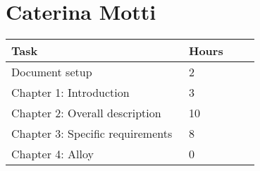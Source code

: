 \section{Caterina Motti}
\begin{center}
	\begin{tabular}{@{}p{0.5\linewidth} p{0.2\linewidth}@{}}
		\hline
		\textbf{Task} & \textbf{Hours} \\ \hline
            Document setup & 2 \\ \hline
            Chapter 1: Introduction & 3 \\ \hline
            Chapter 2: Overall description & 10 \\ \hline
            Chapter 3: Specific requirements & 8 \\ \hline
            Chapter 4: Alloy & 0 \\ \hline
	\end{tabular}
\end{center}
